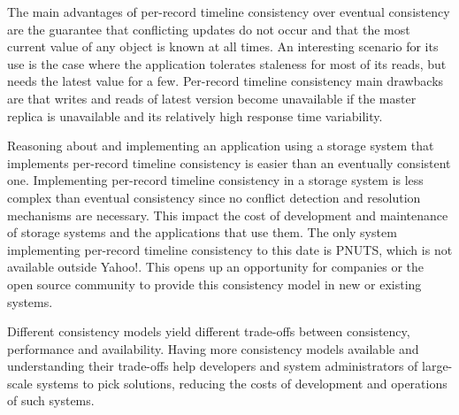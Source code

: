 \documentclass[man,floatsintext,12pt]{apa6}
\begin{document}
The main advantages of per-record timeline consistency over eventual
consistency are the guarantee that conflicting updates do not occur and that
the most current value of any object is known at all times. An interesting
scenario for its use is the case where the application tolerates staleness for
most of its reads, but needs the latest value for a few. Per-record
timeline consistency main drawbacks are that writes and reads of latest version
become unavailable if the master replica is unavailable and its relatively high
response time variability.

Reasoning about and implementing an application using a storage system that
implements per-record timeline consistency is easier than an eventually
consistent one. Implementing per-record timeline consistency in a storage
system is less complex than eventual consistency since no conflict detection
and resolution mechanisms are necessary. This impact the cost of development
and maintenance of storage systems and the applications that use them. The only
system implementing per-record timeline consistency to this date is PNUTS,
which is not available outside Yahoo!. This opens up an opportunity for
companies or the open source community to provide this consistency model in new
or existing systems.

Different consistency models yield different trade-offs between consistency,
performance and availability. Having more consistency models available and
understanding their trade-offs help developers and system administrators of
large-scale systems to pick solutions, reducing the costs of development and
operations of such systems.

%
%
\printbibliography
\end{document}
